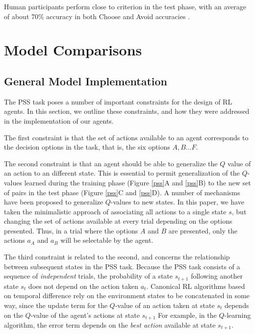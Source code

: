 \documentclass[10pt,letterpaper]{article}
\begin{document}
Human participants perform close to criterion in the test phase, with an average of about 70\% accuracy in both Choose and Avoid accuracies \cite{frank2004carrot, frank2007genetic, stocco2017individual}.

\section{Model Comparisons}

\subsection{General Model Implementation}

The PSS task poses a number of important constraints for the design of RL agents. In this section, we outline these constraints, and how they were addressed in the implementation of our agents. 

The first constraint is that the set of actions available to an agent corresponds to the decision options in the task, that is, the six options $A, B \dots F$. 

The second constraint is that an agent should be able to generalize the $Q$ value of an action to an different state. This is essential to permit generalization of the $Q$-values learned during the training phase (Figure \ref{pss}A and \ref{pss}B) to the new set of pairs in the test phase (Figure \ref{pss}C and \ref{pss}D). A number of mechanisms have been proposed to generalize $Q$-values to new states. In this paper, we have taken the minimalistic approach of associating all actions to a single state $s$, but changing the set of actions available at every trial depending on the options presented. Thus, in a trial where the options $A$ and $B$ are presented, only the actions $a_A$ and $a_B$ will be selectable by the agent.

The third constraint is related to the second, and concerns the relationship between subsequent states in the PSS task. Because the PSS task consists of a sequence of \emph{independent} trials, the probability of a state $s_{t+1}$ following another state $s_{t}$ does not depend on the action taken $a_t$. Canonical RL algorithms based on temporal difference rely on the environment states to be concatenated in some way, since the update term for the $Q$-value of an action taken at state $s_t$ depends on the $Q$-value of the agent's actions at state $s_{t+1}$ For example, in the $Q$-learning algorithm, the error term depends on the \emph{best action} available at state $s_{t+1}$.
\end{document}
